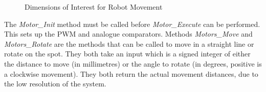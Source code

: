 \begin{figure}
\centering
{}
\caption{Dimensions of Interest for Robot Movement}
\label{fig:RobotBase_Annotated}
\end{figure}

 

The \textit{Motor\_Init} method must be called before \textit{Motor\_Execute} can be performed. This sets up the PWM and analogue comparators. Methods \textit{Motors\_Move} and \textit{Motors\_Rotate} are the methods that can be called to move in a straight line or rotate on the spot. They both take an input which is a signed integer of either the distance to move (in millimetres) or the angle to rotate (in degrees, positive is a clockwise movement). They both return the actual movement distances, due to the low resolution of the system.


